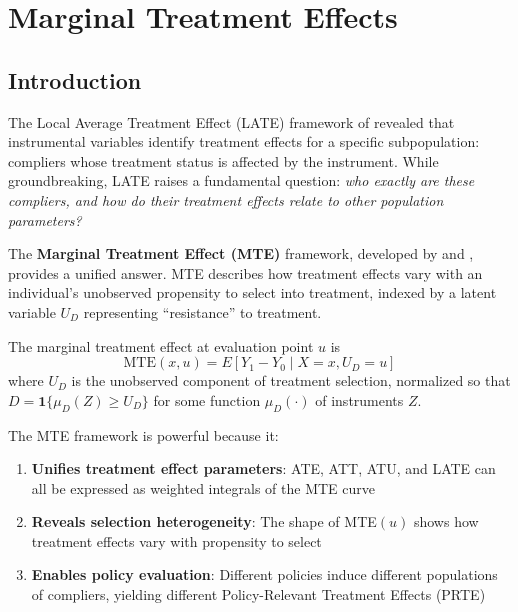 \chapter{Marginal Treatment Effects}
\label{ch:mte}

\section{Introduction}

The Local Average Treatment Effect (LATE) framework of \citet{imbens1994identification} revealed that instrumental variables identify treatment effects for a specific subpopulation: compliers whose treatment status is affected by the instrument. While groundbreaking, LATE raises a fundamental question: \emph{who exactly are these compliers, and how do their treatment effects relate to other population parameters?}

The \textbf{Marginal Treatment Effect (MTE)} framework, developed by \citet{heckman1999local} and \citet{heckman2005structural}, provides a unified answer. MTE describes how treatment effects vary with an individual's unobserved propensity to select into treatment, indexed by a latent variable $U_D$ representing ``resistance'' to treatment.

\begin{definition}
\label{def:mte}
The marginal treatment effect at evaluation point $u$ is
\begin{equation}
\text{MTE}(x, u) = E[Y_1 - Y_0 \mid X = x, U_D = u]
\end{equation}
where $U_D$ is the unobserved component of treatment selection, normalized so that $D = \mathbf{1}\{\mu_D(Z) \geq U_D\}$ for some function $\mu_D(\cdot)$ of instruments $Z$.
\end{definition}

The MTE framework is powerful because it:

\begin{enumerate}
\item \textbf{Unifies treatment effect parameters}: ATE, ATT, ATU, and LATE can all be expressed as weighted integrals of the MTE curve
\item \textbf{Reveals selection heterogeneity}: The shape of MTE$(u)$ shows how treatment effects vary with propensity to select
\item \textbf{Enables policy evaluation}: Different policies induce different populations of compliers, yielding different Policy-Relevant Treatment Effects (PRTE)
\end{enumerate}

